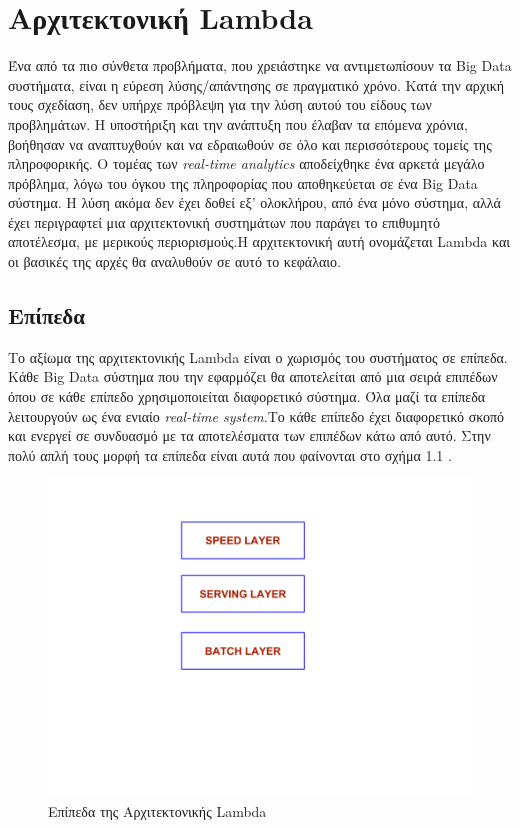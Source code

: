 \chapter{Αρχιτεκτονική Lambda}
Ένα από τα πιο σύνθετα προβλήματα, που χρειάστηκε να αντιμετωπίσουν τα Big Data συστήματα, είναι η εύρεση λύσης/απάντησης σε πραγματικό χρόνο. Κατά την αρχική τους σχεδίαση, δεν υπήρχε πρόβλεψη για την λύση αυτού του είδους των προβλημάτων. Η υποστήριξη και την ανάπτυξη που έλαβαν τα επόμενα χρόνια, βοήθησαν να αναπτυχθούν και να εδραιωθούν σε όλο και περισσότερους τομείς της πληροφορικής. Ο τομέας των \textit{real-time analytics} αποδείχθηκε ένα αρκετά μεγάλο πρόβλημα, λόγω του όγκου της πληροφορίας που αποθηκεύεται σε ένα Big Data σύστημα. Η λύση ακόμα δεν έχει δοθεί εξ' ολοκλήρου, από ένα μόνο σύστημα, αλλά έχει περιγραφτεί μια αρχιτεκτονική συστημάτων που παράγει το επιθυμητό αποτέλεσμα, με μερικούς περιορισμούς.Η αρχιτεκτονική αυτή ονομάζεται Lambda και οι βασικές της αρχές θα αναλυθούν σε αυτό το κεφάλαιο.

\section{Επίπεδα}
Το αξίωμα της αρχιτεκτονικής Lambda είναι ο χωρισμός του συστήματος σε επίπεδα. Κάθε Big Data σύστημα που την εφαρμόζει θα αποτελείται από μια σειρά επιπέδων όπου σε κάθε επίπεδο χρησιμοποιείται διαφορετικό σύστημα. Όλα μαζί τα επίπεδα λειτουργούν ως ένα ενιαίο \textit{real-time system}.Το κάθε επίπεδο έχει διαφορετικό σκοπό και ενεργεί σε συνδυασμό με τα αποτελέσματα των επιπέδων κάτω από αυτό. Στην πολύ απλή τους μορφή τα επίπεδα είναι αυτά που φαίνονται στο σχήμα 1.1 .

\begin{figure}[t]
\caption{Επίπεδα της Αρχιτεκτονικής Lambda}
\includegraphics[width=14cm]{images/layers.png}
\centering
\end{figure}
\clearpage


